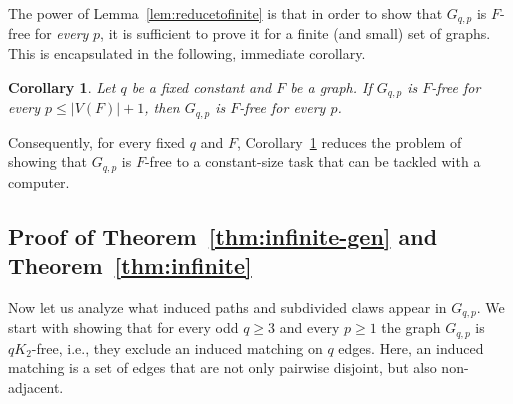 \documentclass[11pt,a4paper]{article}
\theoremstyle{mystyle}
\newtheorem{corollary}[theorem]{Corollary}
\begin{document}
The power of Lemma~\ref{lem:reducetofinite} is that in order to show that $G_{q,p}$ is $F$-free for \emph{every} $p$, it is sufficient to prove it for a finite (and small) set of graphs. This is encapsulated in the following, immediate corollary.

\begin{corollary}\label{cor:reducetofinite}
    Let $q$ be a fixed constant and $F$ be a graph. 
    If $G_{q,p}$ is $F$-free for every $p \leq |V(F)|+1$, then $G_{q,p}$ is $F$-free for every $p$.
\end{corollary}

Consequently, for every fixed $q$ and $F$, Corollary~\ref{cor:reducetofinite} reduces the problem of showing that $G_{q,p}$ is $F$-free to a constant-size task that can be tackled with a computer.


\subsection{Proof of Theorem~\ref{thm:infinite-gen} and Theorem~\ref{thm:infinite}}

Now let us analyze what induced paths and subdivided claws appear in $G_{q,p}$.
We start with showing that for every odd $q \geq 3$ and every $p \geq 1$ the graph $G_{q,p}$ is $qK_2$-free, i.e., they exclude an induced matching on $q$ edges. Here, an induced matching is a set of edges that are not only pairwise disjoint, but also non-adjacent.
\end{document}
